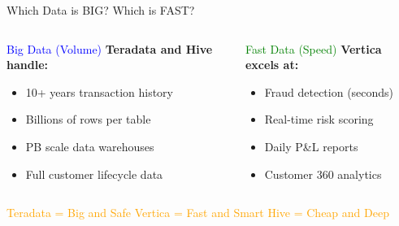 \documentclass{beamer}
\begin{document}
	
	\begin{frame}{Which Data is BIG? Which is FAST?}
		\begin{columns}[T]
			\begin{block}{\textcolor{blue}{Big Data (Volume)}}
				\textbf{Teradata and Hive handle:}
				\begin{itemize}
					\small
					\item 10+ years transaction history
					\item Billions of rows per table
					\item PB scale data warehouses
					\item Full customer lifecycle data
				\end{itemize}
			\end{block}
			
			\begin{block}{\textcolor{green}{Fast Data (Speed)}}
				\textbf{Vertica excels at:}
				\begin{itemize}
					\small
					\item Fraud detection (seconds)
					\item Real-time risk scoring
					\item Daily P\&L reports
					\item Customer 360 analytics
				\end{itemize}
			\end{block}
		\end{columns}
		
		\begin{center}
			\textcolor{orange}{Teradata = Big and Safe \quad Vertica = Fast and Smart \quad Hive = Cheap and Deep}
		\end{center}
	\end{frame}
	
\end{document}
